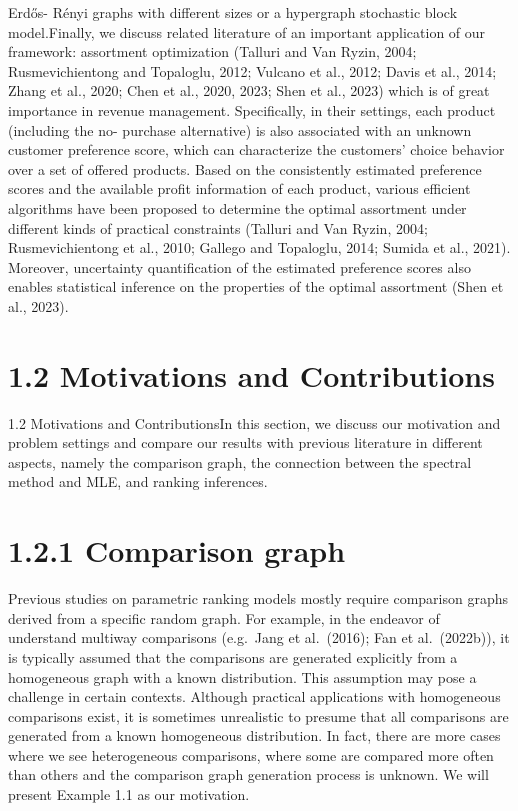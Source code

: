 Erdős- Rényi graphs with different sizes or a hypergraph stochastic
block model.Finally, we discuss related literature of an important
application of our framework: assortment optimization (Talluri and Van
Ryzin, 2004; Rusmevichientong and Topaloglu, 2012; Vulcano et al., 2012;
Davis et al., 2014; Zhang et al., 2020; Chen et al., 2020, 2023; Shen et
al., 2023) which is of great importance in revenue management.
Specifically, in their settings, each product (including the no-
purchase alternative) is also associated with an unknown customer
preference score, which can characterize the customers' choice behavior
over a set of offered products. Based on the consistently estimated
preference scores and the available profit information of each product,
various efficient algorithms have been proposed to determine the optimal
assortment under different kinds of practical constraints (Talluri and
Van Ryzin, 2004; Rusmevichientong et al., 2010; Gallego and Topaloglu,
2014; Sumida et al., 2021). Moreover, uncertainty quantification of the
estimated preference scores also enables statistical inference on the
properties of the optimal assortment (Shen et al., 2023).

\section{1.2 Motivations and
Contributions}\label{motivations-and-contributions}

1.2 Motivations and ContributionsIn this section, we discuss our
motivation and problem settings and compare our results with previous
literature in different aspects, namely the comparison graph, the
connection between the spectral method and MLE, and ranking inferences.

\section{1.2.1 Comparison graph}\label{comparison-graph}

Previous studies on parametric ranking models mostly require comparison
graphs derived from a specific random graph. For example, in the
endeavor of understand multiway comparisons (e.g.~Jang et al.~(2016);
Fan et al.~(2022b)), it is typically assumed that the comparisons are
generated explicitly from a homogeneous graph with a known distribution.
This assumption may pose a challenge in certain contexts. Although
practical applications with homogeneous comparisons exist, it is
sometimes unrealistic to presume that all comparisons are generated from
a known homogeneous distribution. In fact, there are more cases where we
see heterogeneous comparisons, where some are compared more often than
others and the comparison graph generation process is unknown. We will
present Example 1.1 as our motivation.

